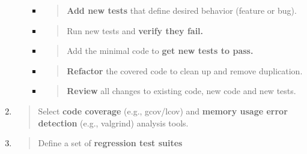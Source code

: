 \documentclass[]{article}
\begin{document}
\begin{enumerate}
\begin{enumerate}
    \begin{itemize}
    \item
      \begin{quote}
      \textbf{Add new tests} that define desired behavior (feature or
      bug).
      \end{quote}
    \item
      \begin{quote}
      Run new tests and \textbf{verify they fail.}
      \end{quote}
    \item
      \begin{quote}
      Add the minimal code to \textbf{get new tests to pass.}
      \end{quote}
    \item
      \begin{quote}
      \textbf{Refactor} the covered code to clean up and remove
      duplication.
      \end{quote}
    \item
      \begin{quote}
      \textbf{Review} all changes to existing code, new code and new
      tests.
      \end{quote}
    \end{itemize}
  \end{enumerate}
\item
  \begin{quote}
  Select \textbf{code coverage} (e.g., gcov/lcov) and \textbf{memory
  usage error detection} (e.g., valgrind) analysis tools.
  \end{quote}
\item
  \begin{quote}
  Define a set of \textbf{regression test suites}
  \end{quote}


\end{enumerate}
\end{document}
